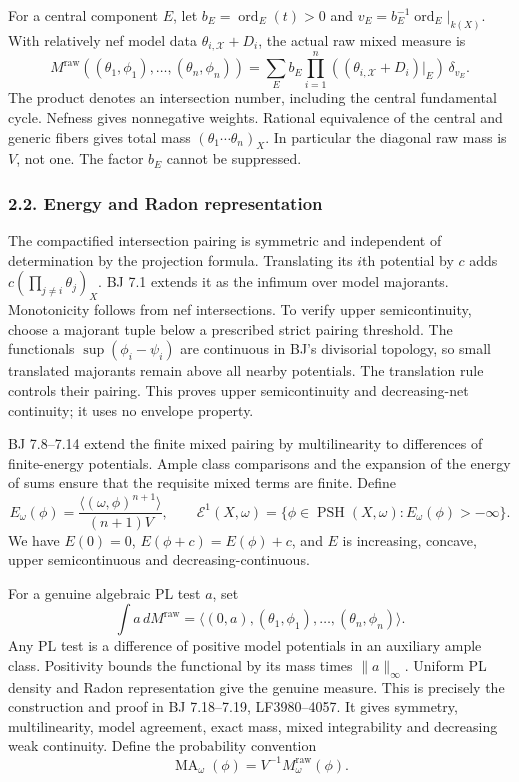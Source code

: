 \documentclass[
  10pt,
]{article}
\begin{document}
For a central component \(E\), let \(b_E=\operatorname{ord}_E(t)>0\) and
\(v_E=b_E^{-1}\operatorname{ord}_E|_{k(X)}\). With relatively nef model
data \(\theta_{i,\mathcal X}+D_i\), the actual raw mixed measure is \[
 M^{\mathrm{raw}}((\theta_1,\phi_1),\ldots,(\theta_n,\phi_n))
 =\sum_E b_E\prod_{i=1}^n((\theta_{i,\mathcal X}+D_i)|_E)\,\delta_{v_E}. \tag{2.1}
\] The product denotes an intersection number, including the central
fundamental cycle. Nefness gives nonnegative weights. Rational
equivalence of the central and generic fibers gives total mass
\((\theta_1\cdots\theta_n)_X\). In particular the diagonal raw mass is
\(V\), not one. The factor \(b_E\) cannot be suppressed.

\subsubsection{2.2. Energy and Radon
representation}\label{energy-and-radon-representation}

The compactified intersection pairing is symmetric and independent of
determination by the projection formula. Translating its \(i\)th
potential by \(c\) adds \(c(\prod_{j\ne i}\theta_j)_X\). BJ 7.1 extends
it as the infimum over model majorants. Monotonicity follows from nef
intersections. To verify upper semicontinuity, choose a majorant tuple
below a prescribed strict pairing threshold. The functionals
\(\sup(\phi_i-\psi_i)\) are continuous in BJ's divisorial topology, so
small translated majorants remain above all nearby potentials. The
translation rule controls their pairing. This proves upper
semicontinuity and decreasing-net continuity; it uses no envelope
property.

BJ 7.8--7.14 extend the finite mixed pairing by multilinearity to
differences of finite-energy potentials. Ample class comparisons and the
expansion of the energy of sums ensure that the requisite mixed terms
are finite. Define \[
 E_\omega(\phi)=\frac{\langle(\omega,\phi)^{n+1}\rangle}{(n+1)V},\qquad
 \mathcal E^1(X,\omega)=\{\phi\in\operatorname{PSH}(X,\omega):E_\omega(\phi)>-\infty\}.
 \tag{2.2}
\] We have \(E(0)=0\), \(E(\phi+c)=E(\phi)+c\), and \(E\) is increasing,
concave, upper semicontinuous and decreasing-continuous.

For a genuine algebraic PL test \(a\), set \[
 \int a\,dM^{\mathrm{raw}}
 =\langle(0,a),(\theta_1,\phi_1),\ldots,(\theta_n,\phi_n)\rangle. \tag{2.3}
\] Any PL test is a difference of positive model potentials in an
auxiliary ample class. Positivity bounds the functional by its mass
times \(\|a\|_\infty\). Uniform PL density and Radon representation give
the genuine measure. This is precisely the construction and proof in BJ
7.18--7.19, LF3980--4057. It gives symmetry, multilinearity, model
agreement, exact mass, mixed integrability and decreasing weak
continuity. Define the probability convention
\[\operatorname{MA}_\omega(\phi)=V^{-1}M^{\mathrm{raw}}_\omega(\phi). \tag{2.4}\]
\end{document}
